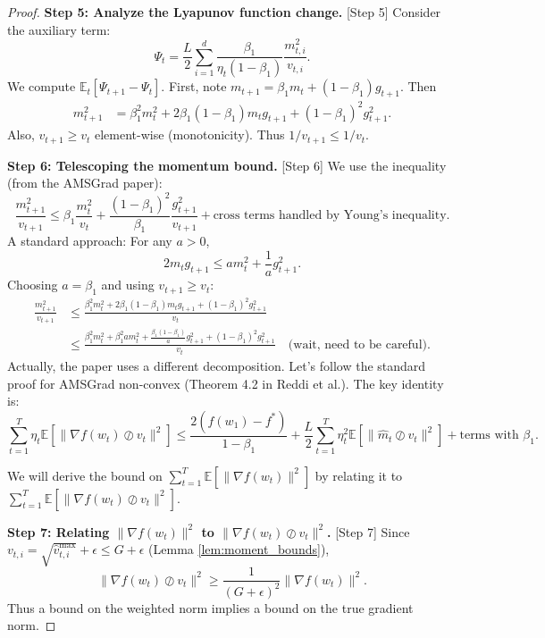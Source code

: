 \documentclass{article}
\begin{document}
\begin{proof}
\textbf{Step 5: Analyze the Lyapunov function change.} [Step 5]
Consider the auxiliary term:
\begin{equation}
    \Psi_t = \frac{L}{2} \sum_{i=1}^d \frac{\beta_1}{\eta_t (1-\beta_1)} \frac{m_{t,i}^2}{v_{t,i}}.
\end{equation}
We compute $\mathbb{E}_t[\Psi_{t+1} - \Psi_t]$. First, note $m_{t+1} = \beta_1 m_t + (1-\beta_1) g_{t+1}$. Then
\begin{align}
    m_{t+1}^2 &= \beta_1^2 m_t^2 + 2\beta_1(1-\beta_1) m_t g_{t+1} + (1-\beta_1)^2 g_{t+1}^2. \tag{5}
\end{align}
Also, $v_{t+1} \ge v_t$ element-wise (monotonicity). Thus $1/v_{t+1} \le 1/v_t$.

\textbf{Step 6: Telescoping the momentum bound.} [Step 6]
We use the inequality (from the AMSGrad paper):
\begin{equation}
    \frac{m_{t+1}^2}{v_{t+1}} \le \beta_1 \frac{m_t^2}{v_t} + \frac{(1-\beta_1)^2}{\beta_1} \frac{g_{t+1}^2}{v_{t+1}} + \text{cross terms handled by Young's inequality}. \tag{6}
\end{equation}
A standard approach: For any $a>0$,
\begin{equation}
    2 m_t g_{t+1} \le a m_t^2 + \frac{1}{a} g_{t+1}^2.
\end{equation}
Choosing $a = \beta_1$ and using $v_{t+1} \ge v_t$:
\begin{align}
    \frac{m_{t+1}^2}{v_{t+1}} &\le \frac{\beta_1^2 m_t^2 + 2\beta_1(1-\beta_1) m_t g_{t+1} + (1-\beta_1)^2 g_{t+1}^2}{v_t} \\
    &\le \frac{\beta_1^2 m_t^2 + \beta_1^2 a m_t^2 + \frac{\beta_1(1-\beta_1)}{a} g_{t+1}^2 + (1-\beta_1)^2 g_{t+1}^2}{v_t} \quad \text{(wait, need to be careful)}.
\end{align}
Actually, the paper uses a different decomposition. Let's follow the standard proof for AMSGrad non-convex (Theorem 4.2 in Reddi et al.). The key identity is:
\begin{equation}
    \sum_{t=1}^T \eta_t \mathbb{E}[\|\nabla f(w_t) \oslash v_t\|^2] \le \frac{2(f(w_1)-f^*)}{1-\beta_1} + \frac{L}{2} \sum_{t=1}^T \eta_t^2 \mathbb{E}[\|\hat{m}_t \oslash v_t\|^2] + \text{terms with } \beta_1.
\end{equation}

We will derive the bound on $\sum_{t=1}^T \mathbb{E}[\|\nabla f(w_t)\|^2]$ by relating it to $\sum_{t=1}^T \mathbb{E}[\|\nabla f(w_t) \oslash v_t\|^2]$.

\textbf{Step 7: Relating $\|\nabla f(w_t)\|^2$ to $\|\nabla f(w_t) \oslash v_t\|^2$.} [Step 7]
Since $v_{t,i} = \sqrt{\hat{v}_{t,i}^{\text{max}}} + \epsilon \le G + \epsilon$ (Lemma \ref{lem:moment_bounds}),
\begin{equation}
    \|\nabla f(w_t) \oslash v_t\|^2 \ge \frac{1}{(G+\epsilon)^2} \|\nabla f(w_t)\|^2. \tag{7}
\end{equation}
Thus a bound on the weighted norm implies a bound on the true gradient norm.


\end{proof}
\end{document}
